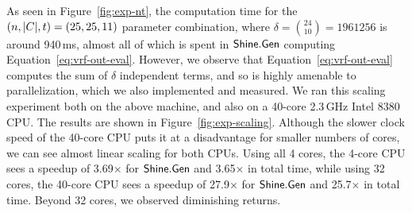 As seen in Figure~\ref{fig:exp-nt}, the computation time for the $(n,|C|,t)
= (25, 25, 11)$ parameter combination, where $\delta = {24 \choose 10} =
1961256$ is around 940\,ms, almost all of which is spent in
$\mathsf{Shine}.\mathsf{Gen}$ computing Equation~\ref{eq:vrf-out-eval}.
However, we observe that Equation~\ref{eq:vrf-out-eval} computes the sum of $\delta$
independent terms, and so is highly amenable to parallelization, which we also implemented and measured.
We ran this scaling experiment both on the above machine, and also on
a 40-core 2.3\,GHz Intel 8380 CPU.  The results are shown in
Figure~\ref{fig:exp-scaling}.  Although the slower clock speed of the
40-core CPU puts it at a disadvantage for smaller numbers of cores,
we can see almost linear scaling for both CPUs.  Using all 4 cores, the
4-core CPU sees a speedup of 3.69$\times$ for $\mathsf{Shine}.\mathsf{Gen}$ and
3.65$\times$ in total time, while using 32 cores, the 40-core CPU sees a
speedup of 27.9$\times$ for $\mathsf{Shine}.\mathsf{Gen}$ and 25.7$\times$ in total time.
Beyond 32 cores, we observed diminishing returns.



